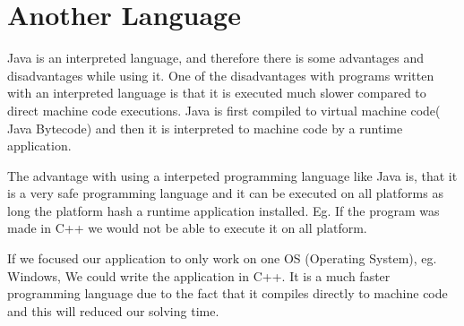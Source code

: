 \section{Another Language}
Java is an interpreted language, and therefore there is some advantages and disadvantages while using it. One of the disadvantages with programs written with an interpreted language is that it is executed much slower compared to direct machine code executions. Java is first compiled to virtual machine code( Java Bytecode) and then it is interpreted to machine code by a runtime application.

The advantage with using a interpeted programming language like Java is, that it is a very safe programming language and it can be executed on all platforms as long the platform hash a runtime application installed. Eg. If the program was made in C++ we would not be able to execute it on all platform.

If we focused our application to only work on one OS (Operating System), eg. Windows, We could write the application in C++. It is a much faster programming language due to the fact that it compiles directly to machine code and this will reduced our solving time.